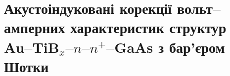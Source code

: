 \documentclass[a4paper,14pt,oneside,openany]{memoir}
\begin{document}
%
%
%
%
%
%
%




%




\section{Акустоіндуковані корекції вольт--амперних характеристик структур Au--TiB$_x$--$n$--$n^+$--GaAs з бар'єром Шотки\label{MSGA}}
\end{document}
